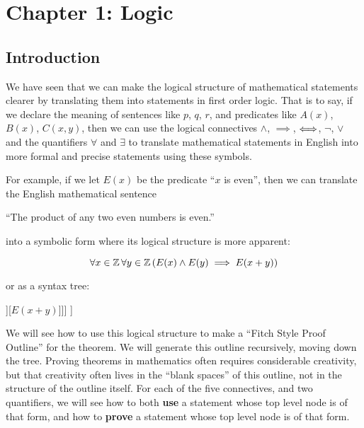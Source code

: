 
\chapter{Chapter 1: Logic}

\section{Introduction}

We have seen that we can make the logical structure of mathematical statements clearer by translating them into statements in first order logic.  That is to say, if we declare the meaning of sentences like $p$, $q$, $r$,  and predicates like $A(x)$,  $B(x)$,  $C(x,y)$, then we can use the logical connectives $\wedge$, $\implies$, $\Longleftrightarrow$, $\neg$, $\vee$ and the quantifiers $\forall$ and $\exists$ to translate mathematical statements in English into more formal and precise statements using these symbols.

For example, if we let $E(x)$ be the predicate ``$x$ is even'', then we can translate the English mathematical sentence 

{ \begin{center}
		``The product of any two even numbers is even.''
		\end{center}
}

into a symbolic form where its logical structure is more apparent:

$$
\forall x \in \mathbb{Z} \, \forall y \in \mathbb{Z} \left( E(x) \wedge E(y) \implies E(x+y) \right)
$$

or as a syntax tree:

\begin{center}
\begin{forest}
	[$\forall x \in \Z$[$\forall y \in \Z$[$\implies$[$\wedge$[$E(x)$][$E(y)$]][$E(x+y)$]]]
]
\end{forest}
\end{center}

We will see how to use this logical structure to make a ``Fitch Style Proof Outline''  for the theorem.  We will generate this outline recursively, moving down the tree.  Proving theorems in mathematics often requires considerable creativity, but that creativity often lives in the ``blank spaces'' of this outline, not in the structure of the outline itself.  For each of the five connectives, and two quantifiers, we will see how to both \textbf{use} a statement whose top level node is of that form, and how to \textbf{prove} a statement whose top level node is of that form.

